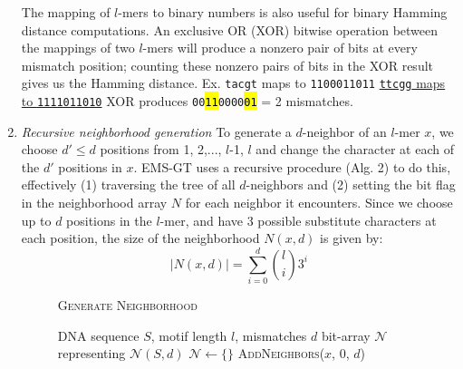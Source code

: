 \documentclass{acm_proc_article-sp}
\begin{document}
\begin{enumerate}
			The mapping of $l$-mers to binary numbers  is also useful for binary Hamming distance computations. An exclusive OR (XOR) bitwise operation between the mappings of two $l$-mers will produce a nonzero pair of bits at every mismatch position; counting these nonzero pairs of bits in the XOR result gives us the Hamming distance.\newline \newline
			{\small Ex.	\texttt{tacgt} maps to \texttt{1100011011} \newline
				\vspace*{2pt}\hspace*{12pt} \underline{\texttt{ttcgg} maps to \texttt{1111011010}} \newline
				\hspace*{17pt}	XOR produces \texttt{00\hl{11}0000\hl{01}} = 2 mismatches.}
		\item{\em Recursive neighborhood generation}\newline
			To generate a $d$-neighbor of an $l$-mer $x$, we choose $d' \leq d$ positions from 1, 2,..., $l$-1, $l$ and change the character at each of the $d'$ positions in $x$. EMS-GT uses a recursive procedure (Alg. 2) to do this, effectively (1) traversing the tree of all $d$-neighbors and (2) setting the bit flag in the neighborhood array $N$ for each neighbor it encounters. Since we choose up to $d$ positions in the $l$-mer, and have 3 possible substitute characters at each position, the size of the neighborhood $N(x,d)$ is given by: %
			\begin{equation}
				|N(x,d)| = \sum_{i=0}^d \binom{l}{i} 3^{i}
			\end{equation}
			\bigskip
			\begin{figure}[h]
			\noindent \hspace*{6pt}{\bf Algorithm 2} \textsc{Generate Neighborhood}
			\begin{algorithmic}[1]
				\label{alg:recursive-nbr-gen}
				\Require DNA sequence $S$, motif length $l$, mismatches $d$
				\Ensure bit-array $\mathcal{N}$ representing $\mathcal{N}(S,d)$ \vspace*{6pt}
				\State $\mathcal{N}\leftarrow \{\}$
				\State \textsc{AddNeighbors}($x$, 0, $d$) \hspace*{9pt}
				\EndFor
				\State {}

\end{algorithmic}
\end{figure}
\end{enumerate}
\end{document}
